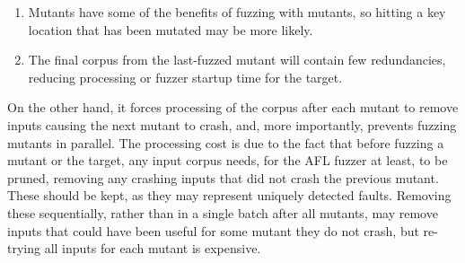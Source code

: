 \begin{enumerate}
\item Mutants have some of the benefits of fuzzing with mutants, so hitting a key location that has been
mutated may be more likely.
\item The final corpus from the last-fuzzed mutant will contain few redundancies, reducing processing or
fuzzer startup time for the target.
\end{enumerate}

On the other hand, it forces processing of the corpus after each
mutant to remove inputs causing the next mutant to crash, and, more
importantly, prevents fuzzing mutants in parallel.  The processing
cost is due to the fact that before fuzzing a mutant or the target,
any input corpus needs, for the AFL fuzzer at least, to be pruned, removing any
crashing inputs that did not crash the previous mutant.  These should
be kept, as they may represent uniquely detected faults.  Removing these sequentially, rather than in a single batch after all mutants, may remove inputs that could have been useful for some mutant they do not crash, but re-trying all inputs for each mutant is expensive.
